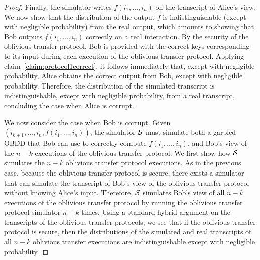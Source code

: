 \begin{proof}
Finally, the simulator writes $f(i_1,\ldots,i_n)$ on the transcript
of Alice's view. We now show that the distribution of the output $f$
is indistinguishable (except with negligible probability) from the
real output, which amounts to showing that Bob outputs
$f(i_1,\ldots,i_n)$ correctly on a real interaction. By the security
of the oblivious transfer protocol, Bob is provided with the correct
keys corresponding to its input during each execution of the oblivious
transfer protocol. Applying claim~\ref{claim:protocol1correct}, it
follows immediately that, except with negligible probability, Alice
obtains the correct output from Bob, except with negligible
probability. Therefore, the distribution of the simulated transcript
is indistinguishable, except with negligible probability, from a real
transcript, concluding the case when Alice is corrupt.

We now consider the case when Bob is corrupt. Given
$(i_{k+1},\ldots,i_n, f(i_1,\ldots,i_n))$, the simulator ${\mathcal{S}}$ must
simulate both a garbled OBDD that Bob can use to correctly compute
$f(i_1,\ldots,i_n)$, and Bob's view of the $n-k$ executions of the
oblivious transfer protocol. We first show how ${\mathcal{S}}$ simulates the
$n-k$ oblivious transfer protocol executions. As in the previous case,
because the oblivious transfer protocol is secure, there exists a
simulator that can simulate the transcript of Bob's view of the
oblivious transfer protocol without knowing Alice's input. Therefore,
${\mathcal{S}}$ simulates Bob's view of all $n-k$ executions of the
oblivious transfer protocol by running the oblivious transfer protocol
simulator $n-k$ times. Using a standard hybrid argument on the
transcripts of the oblivious transfer protocols, we see that if the
oblivious transfer protocol is secure, then the distributions of the
simulated and real transcripts of all $n-k$ oblivious transfer
executions are indistinguishable except with negligible probability.


\end{proof}
